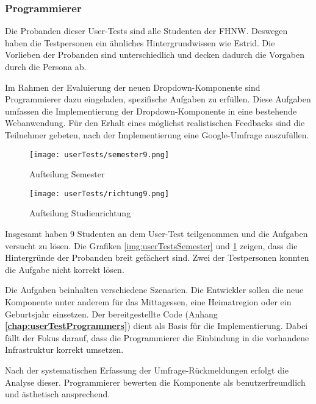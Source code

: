 \subsubsection{\color{dblue} Programmierer}
\label{sec:userTestsProgrammer}

Die Probanden dieser User-Tests sind alle Studenten der FHNW. 
Deswegen haben die Testpersonen ein ähnliches Hintergrundwissen wie Estrid. 
Die Vorlieben der Probanden sind unterschiedlich und decken dadurch die Vorgaben durch die Persona ab. 

Im Rahmen der Evaluierung der neuen Dropdown-Komponente sind Programmierer dazu eingeladen, spezifische Aufgaben zu erfüllen. 
Diese Aufgaben umfassen die Implementierung der Dropdown-Komponente in eine bestehende Webanwendung. 
Für den Erhalt eines möglichst realistischen Feedbacks sind die Teilnehmer gebeten, nach der Implementierung eine Google-Umfrage auszufüllen. 

\begin{figure}[!htb]
    \centering
    \begin{minipage}[b]{0.45\textwidth}
        \centering
        \texttt{[image: userTests/semester9.png]}
        \caption{\centering Aufteilung Semester}
        \label{img:userTestsSemester}
    \end{minipage}
    \hfill
    \begin{minipage}[b]{0.45\textwidth}
        \centering
        \texttt{[image: userTests/richtung9.png]}
        \caption{\centering Aufteilung Studienrichtung}
        \label{img:userTestsStudy}
    \end{minipage}
\end{figure}

Insgesamt haben 9 Studenten an dem User-Test teilgenommen und die Aufgaben versucht zu lösen. 
Die Grafiken \ref{img:userTestsSemester} und \ref{img:userTestsStudy} zeigen, dass die Hintergründe der Probanden breit gefächert sind. 
Zwei der Testpersonen konnten die Aufgabe nicht korrekt lösen. 

Die Aufgaben beinhalten verschiedene Szenarien. 
Die Entwickler sollen die neue Komponente unter anderem für das Mittagessen, eine Heimatregion oder ein Geburtsjahr einsetzen. 
Der bereitgestellte Code (Anhang \textbf{\ref{chap:userTestProgrammers}}) dient als Basis für die Implementierung. 
Dabei fällt der Fokus darauf, dass die Programmierer die Einbindung in die vorhandene Infrastruktur korrekt umsetzen. 

Nach der systematischen Erfassung der Umfrage-Rückmeldungen erfolgt die Analyse dieser. 
Programmierer bewerten die Komponente als benutzerfreundlich und ästhetisch ansprechend. 

